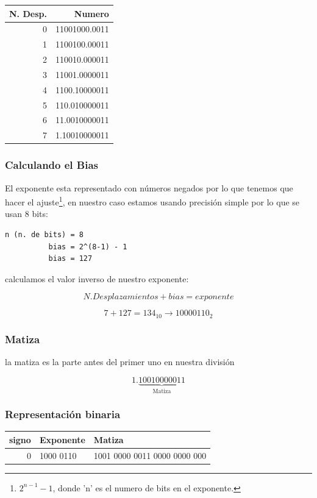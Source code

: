 \documentclass[11pt]{article}
\begin{document}
\begin{center}
\begin{tabular}{|r|r|}
\hline
N. Desp. & Numero\\
\hline
0 & 11001000.0011\\
1 & 1100100.00011\\
2 & 110010.000011\\
3 & 11001.0000011\\
4 & 1100.10000011\\
5 & 110.010000011\\
6 & 11.0010000011\\
7 & 1.10010000011\\
\hline
\end{tabular}
\end{center}

\subsubsection*{Calculando el Bias}
\label{sec:orga1d52c9}
El exponente esta representado con números negados por lo que tenemos que hacer el ajuste\footnote{\(2^{n-1} - 1\), donde 'n' es el numero de bits en el exponente.}, en nuestro caso estamos usando precisión simple por lo que se usan 8 bits:

\begin{verbatim}
n (n. de bits) = 8
          bias = 2^(8-1) - 1
          bias = 127
\end{verbatim}

calculamos el valor inverso de nuestro exponente:

\[ N. Desplazamientos + bias = exponente \]

\[ 7 + 127 = 134_{10} \rightarrow \boxed{10000110_2} \]

\subsubsection*{Matiza}
\label{sec:org92e478d}
la matiza es la parte antes del primer uno en nuestra división

\[
1.\underbrace{10010000011}_{\text{Matiza}}
\]

\subsubsection*{Representación binaria}
\label{sec:orge56c2e1}
\begin{center}
\begin{tabular}{|r|l|l|}
\hline
signo & Exponente & Matiza\\
\hline
0 & 1000 0110 & 1001 0000 0011 0000 0000 000\\
\hline
\end{tabular}
\end{center}
\end{document}
